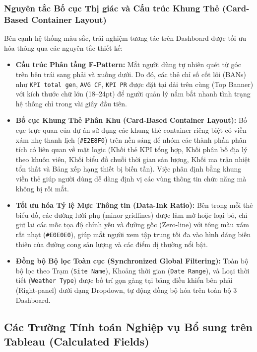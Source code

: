 \documentclass[12pt, a4paper]{report}
\begin{document}
\subsubsection{Nguyên tắc Bố cục Thị giác và Cấu trúc Khung Thẻ (Card-Based Container Layout)}

Bên cạnh hệ thống màu sắc, trải nghiệm tương tác trên Dashboard được tối ưu hóa thông qua các nguyên tắc thiết kế:
\begin{itemize}[noitemsep]
    \item \textbf{Cấu trúc Phân tầng F-Pattern:} Mắt người dùng tự nhiên quét từ góc trên bên trái sang phải và xuống dưới. Do đó, các thẻ chỉ số cốt lõi (BANs) như \texttt{KPI total gen}, \texttt{AVG CF}, \texttt{KPI PR} được đặt tại dải trên cùng (Top Banner) với kích thước chữ lớn (18--24pt) để người quản lý nắm bắt nhanh tình trạng hệ thống chỉ trong vài giây đầu tiên.
    \item \textbf{Bố cục Khung Thẻ Phân Khu (Card-Based Container Layout):} Bố cục trực quan của dự án sử dụng các khung thẻ container riêng biệt có viền xám nhẹ thanh lịch (\texttt{\#E2E8F0}) trên nền sáng để nhóm các thành phần phân tích có liên quan về mặt logic (Khối thẻ KPI tổng hợp, Khối phân bố địa lý theo khuôn viên, Khối biểu đồ chuỗi thời gian sản lượng, Khối ma trận nhiệt tổn thất và Bảng xếp hạng thiết bị biến tần). Việc phân định bằng khung viền thẻ giúp người dùng dễ dàng định vị các vùng thông tin chức năng mà không bị rối mắt.
    \item \textbf{Tối ưu hóa Tỷ lệ Mực Thông tin (Data-Ink Ratio):} Bên trong mỗi thẻ biểu đồ, các đường lưới phụ (minor gridlines) được làm mờ hoặc loại bỏ, chỉ giữ lại các mốc tọa độ chính yếu và đường gốc (Zero-line) với tông màu xám rất nhạt (\texttt{\#E0E0E0}), giúp mắt người xem tập trung tối đa vào hình dáng biến thiên của đường cong sản lượng và các điểm dị thường nổi bật.
    \item \textbf{Đồng bộ Bộ lọc Toàn cục (Synchronized Global Filtering):} Toàn bộ bộ lọc theo Trạm (\texttt{Site Name}), Khoảng thời gian (\texttt{Date Range}), và Loại thời tiết (\texttt{Weather Type}) được bố trí gọn gàng tại bảng điều khiển bên phải (Right-panel) dưới dạng Dropdown, tự động đồng bộ hóa trên toàn bộ 3 Dashboard.
\end{itemize}

\subsection{Các Trường Tính toán Nghiệp vụ Bổ sung trên Tableau (Calculated Fields)}
\label{subsec:calculated_fields}
\end{document}
